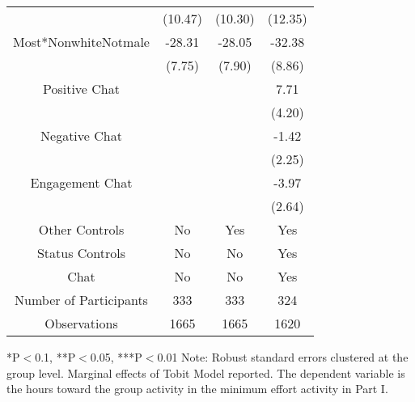 \begin{table}[htbp]
\begin{tabular}{c c c c}
                                 &  (10.47)        &     (10.30)             &  (12.35) \\
Most*NonwhiteNotmale    &   -28.31\sym{***} &   -28.05\sym{***}     &  -32.38\sym{***}  \\
                                 &  (7.75)        &     (7.90)             &  (8.86)   \\
Positive Chat                        &                     &                       &  7.71\sym{*}  \\
                                 &                     &                           &  (4.20)  \\
Negative  Chat                       &                     &                       &  -1.42  \\
                                 &                     &                           &  (2.25)  \\
Engagement Chat                      &                     &                       &  -3.97  \\
                                 &                     &                           &  (2.64)  \\
\midrule
Other Controls                   &    No               &    Yes                    &    Yes        \\
Status Controls                    &    No               &    No                   &    Yes        \\
Chat                             &    No               &    No                     &    Yes        \\
\midrule
Number of Participants           &    333               &    333                   &    324        \\
\midrule
Observations                     &       1665          &       1665                &  1620    \\
\bottomrule

\end{tabular}
\begin{footnotesize}
\newline
*P$<$0.1, **P$<$0.05, ***P$<$0.01
\newline
Note: Robust standard errors clustered at the group level. Marginal effects of Tobit Model reported. 
\newline
The dependent variable is the hours toward the group activity in the minimum effort activity in Part I.\end{footnotesize}
\end{table}